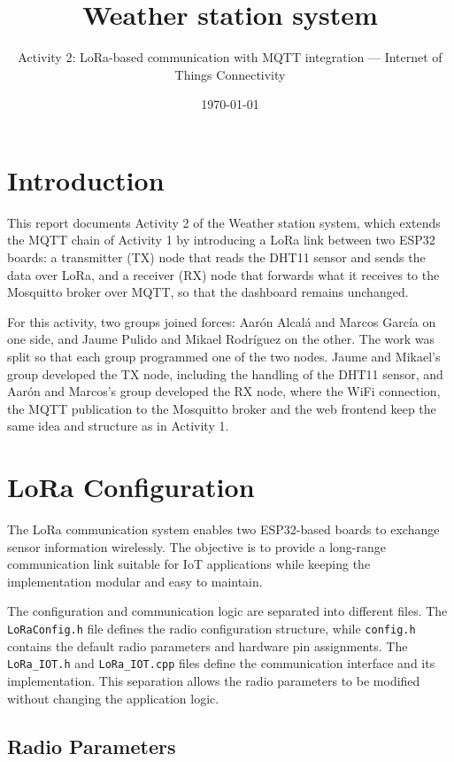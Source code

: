 \documentclass[informe,english]{plantilla}
\title{Weather station system}
\subtitle{Activity 2: LoRa-based communication with MQTT integration ---
  \textsf{Internet of Things Connectivity}}
\date{\today}
\begin{document}
\newpage

\section{Introduction}
\label{sec:intro}
This report documents Activity 2 of the Weather station system, which extends the MQTT chain of Activity 1 by introducing a LoRa link between two ESP32 boards: a transmitter (TX) node that reads the DHT11 sensor and sends the data over LoRa, and a receiver (RX) node that forwards what it receives to the Mosquitto broker over MQTT, so that the dashboard remains unchanged.

For this activity, two groups joined forces: Aarón Alcalá and Marcos García on one side, and Jaume Pulido and Mikael Rodríguez on the other. The work was split so that each group programmed one of the two nodes. Jaume and Mikael's group developed the TX node, including the handling of the DHT11 sensor, and Aarón and Marcos's group developed the RX node, where the WiFi connection, the MQTT publication to the Mosquitto broker and the web frontend keep the same idea and structure as in Activity 1.

\section{LoRa Configuration}
\label{sec:lora-config}

The LoRa communication system enables two ESP32-based boards to exchange sensor information wirelessly. The objective is to provide a long-range communication link suitable for IoT applications while keeping the implementation modular and easy to maintain.

The configuration and communication logic are separated into different files. The \texttt{LoRaConfig.h} file defines the radio configuration structure, while \texttt{config.h} contains the default radio parameters and hardware pin assignments. The \texttt{LoRa\_IOT.h} and \texttt{LoRa\_IOT.cpp} files define the communication interface and its implementation. This separation allows the radio parameters to be modified without changing the application logic.

\subsection{Radio Parameters}
\label{sec:lora-params}
\end{document}
